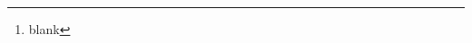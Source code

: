 \documentclass{article}
\title{}
\author{Decory Edwards\thanks{blank}}
\date{\today}
\begin{document}
\maketitle


\vspace{2em}
\noindent
\begin{abstract}
  \noindent
  
\end{abstract}

\newpage





\clearpage


\printbibliography

\FloatBarrier
\clearpage
%
\end{document}
